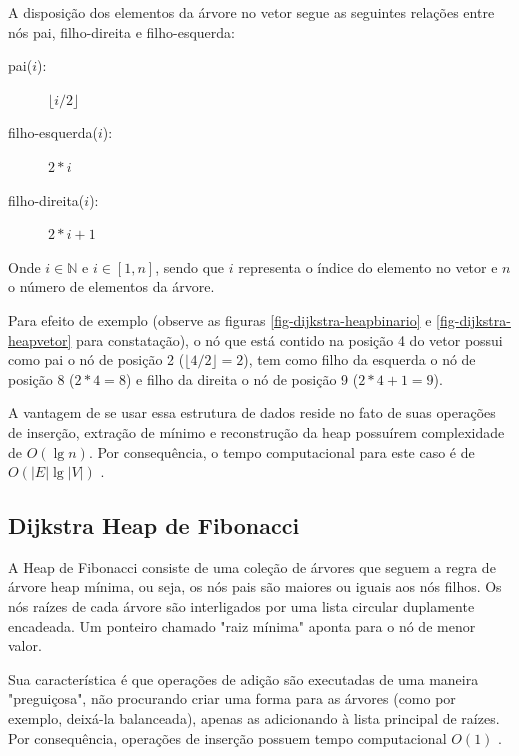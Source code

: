 A disposição dos elementos da árvore no vetor segue as seguintes relações entre nós pai, filho-direita e filho-esquerda:
\begin{description}
\item[pai($i$):] $\lfloor i/2 \rfloor$
\item[filho-esquerda($i$):] $2*i$
\item[filho-direita($i$):] $2*i+1$
\end{description}
Onde $i \in \mathbb{N}$ e $i \in [1, n]$, sendo que $i$ representa o índice do elemento no vetor e $n$ o número de elementos da árvore.

 Para efeito de exemplo (observe as figuras \ref{fig-dijkstra-heapbinario} e \ref{fig-dijkstra-heapvetor} para constatação), o nó que está contido na posição 4 do vetor possui como pai o nó de posição 2 ($\lfloor 4 / 2 \rfloor = 2$), tem como filho da esquerda o nó de posição 8 ($2*4 = 8$) e filho da direita o nó de posição 9 ($2*4+1 = 9$).


A vantagem de se usar essa estrutura de dados reside no fato de suas operações de inserção, extração de mínimo e reconstrução da heap possuírem complexidade de $O(\lg n)$. Por consequência, o tempo computacional para este caso é de $O(|E| \lg |V|)$ \cite{cormen2009introduction}.

\subsection{Dijkstra Heap de Fibonacci}
\label{sec-dijkstra-versoes-fibonacci}
A Heap de Fibonacci consiste de uma coleção de árvores que seguem a regra de árvore heap mínima, ou seja, os nós pais são maiores ou iguais aos nós filhos. Os nós raízes de cada árvore são interligados por uma lista circular duplamente encadeada. Um ponteiro chamado "raiz mínima" aponta para o nó de menor valor.

Sua característica é que operações de adição são executadas de uma maneira "preguiçosa", não procurando criar uma forma para as árvores (como por exemplo, deixá-la balanceada), apenas as adicionando à lista principal de raízes. Por consequência, operações de inserção possuem tempo computacional $O(1)$ \cite{cormen2009introduction}.

